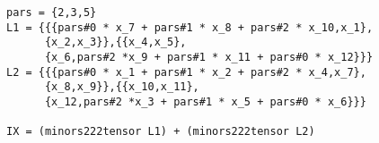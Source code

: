\begin{minipage}{\linewidth}
\begin{lstlisting}[caption=Code for $X_{K_t}$, language=Macaulay2]
pars = {2,3,5}
L1 = {{{pars#0 * x_7 + pars#1 * x_8 + pars#2 * x_10,x_1},
      {x_2,x_3}},{{x_4,x_5},
      {x_6,pars#2 *x_9 + pars#1 * x_11 + pars#0 * x_12}}}
L2 = {{{pars#0 * x_1 + pars#1 * x_2 + pars#2 * x_4,x_7},
      {x_8,x_9}},{{x_10,x_11},
      {x_12,pars#2 *x_3 + pars#1 * x_5 + pars#0 * x_6}}}

IX = (minors222tensor L1) + (minors222tensor L2)
\end{lstlisting}
\end{minipage} 